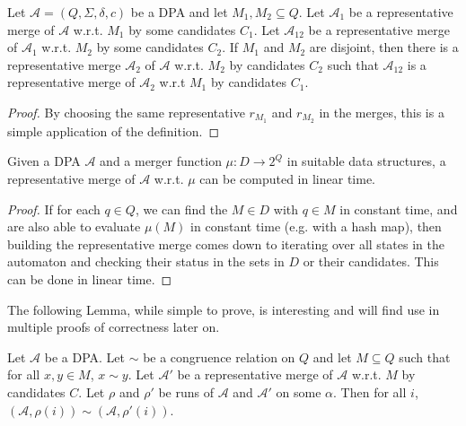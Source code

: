 \begin{lem}
	Let $\mathcal{A} = (Q, \Sigma, \delta, c)$ be a DPA and let $M_1, M_2 \subseteq Q$. Let $\mathcal{A}_1$ be a representative merge of $\mathcal{A}$ w.r.t. $M_1$ by some candidates $C_1$. Let $\mathcal{A}_{12}$ be a representative merge of $\mathcal{A}_1$ w.r.t. $M_2$ by some candidates $C_2$. If $M_1$ and $M_2$ are disjoint, then there is a representative merge $\mathcal{A}_2$ of $\mathcal{A}$ w.r.t. $M_2$ by candidates $C_2$ such that $\mathcal{A}_{12}$ is a representative merge of $\mathcal{A}_2$ w.r.t $M_1$ by candidates $C_1$.
\end{lem}

\begin{proof}
	By choosing the same representative $r_{M_1}$ and $r_{M_2}$ in the merges, this is a simple application of the definition.
\end{proof}

\begin{lem}
	Given a DPA $\mathcal{A}$ and a merger function $\mu : D \rightarrow 2^Q$ in suitable data structures, a representative merge of $\mathcal{A}$ w.r.t. $\mu$ can be computed in linear time.
	\label{lem:general:repmerge_lintime}
\end{lem}

\begin{proof}
	If for each $q \in Q$, we can find the $M \in D$ with $q \in M$ in constant time, and are also able to evaluate $\mu(M)$ in constant time (e.g. with a hash map), then building the representative merge comes down to iterating over all states in the automaton and checking their status in the sets in $D$ or their candidates. This can be done in linear time.
\end{proof}

\vspace{10pt}

The following Lemma, while simple to prove, is interesting and will find use in multiple proofs of correctness later on.

\begin{lem}
	Let $\mathcal{A}$ be a DPA. Let $\sim$ be a congruence relation on $Q$ and let $M \subseteq Q$ such that for all $x, y \in M$, $x \sim y$. Let $\mathcal{A}'$ be a representative merge of $\mathcal{A}$ w.r.t. $M$ by candidates $C$. Let $\rho$ and $\rho'$ be runs of $\mathcal{A}$ and $\mathcal{A}'$ on some $\alpha$. Then for all $i$, $(\mathcal{A}, \rho(i)) \sim (\mathcal{A}, \rho'(i))$.
	\label{lem:general:cong_stays_in_merge}
\end{lem}

